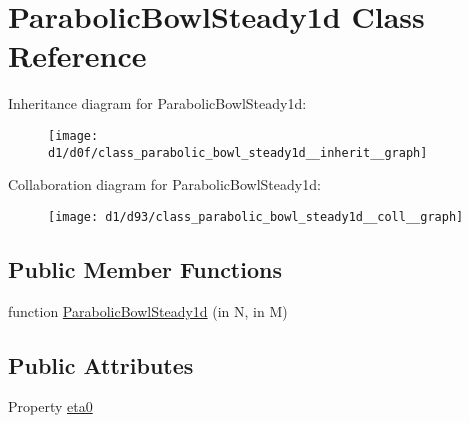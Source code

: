 \hypertarget{class_parabolic_bowl_steady1d}{}\section{Parabolic\+Bowl\+Steady1d Class Reference}
\label{class_parabolic_bowl_steady1d}


Inheritance diagram for Parabolic\+Bowl\+Steady1d\+:
\nopagebreak
\begin{figure}[H]
\begin{center}
\leavevmode
\texttt{[image: d1/d0f/class\_parabolic\_bowl\_steady1d\_\_inherit\_\_graph]}
\end{center}
\end{figure}


Collaboration diagram for Parabolic\+Bowl\+Steady1d\+:
\nopagebreak
\begin{figure}[H]
\begin{center}
\leavevmode
\texttt{[image: d1/d93/class\_parabolic\_bowl\_steady1d\_\_coll\_\_graph]}
\end{center}
\end{figure}
\subsection*{Public Member Functions}
\begin{DoxyCompactItemize}
\item 
function \hyperlink{class_parabolic_bowl_steady1d_a7f5b9079702db13dd85827c5b26fe42b}{Parabolic\+Bowl\+Steady1d} (in N, in M)
\end{DoxyCompactItemize}
\subsection*{Public Attributes}
\begin{DoxyCompactItemize}
\item 
Property \hyperlink{class_parabolic_bowl_steady1d_a15df6e8b776c6dc5b3e9426be69890ee}{eta0}
\end{DoxyCompactItemize}

